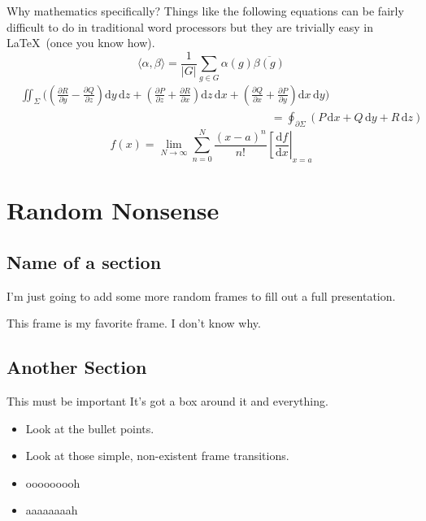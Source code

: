 \documentclass{beamer}
\begin{document}
\begin{frame}
Why mathematics specifically?  Things like the following equations can be fairly difficult to do in traditional word processors but they are trivially easy in \LaTeX\ (once you know how).
\bigskip
\[ \langle \alpha , \beta \rangle = \frac{1}{\vert G \vert} \sum_{g \in G} \alpha(g) \overline{\beta(g)} \]
\bigskip
{\scriptsize
\begin{equation*}
\begin{split}
&\iint_\Sigma \Bigg( \left( \frac{\partial R}{\partial y} - \frac{\partial Q}{\partial z} \right) \mathrm{d}y\,\mathrm{d}z + \left( \frac{\partial P}{\partial z} + \frac{\partial R}{\partial x} \right) \mathrm{d}z\,\mathrm{d}x + \left( \frac{\partial Q}{\partial x} + \frac{\partial P}{\partial y} \right) \mathrm{d}x\,\mathrm{d}y   \Bigg) \\
&\hspace{22em} = \oint_{\partial\Sigma} (P\,\mathrm{d}x + Q\,\mathrm{d}y + R\,\mathrm{d}z)
\end{split}
\end{equation*}
}
\bigskip
\[ f(x) = \lim_{N\to\infty}\sum_{n=0}^N \frac{(x-a)^n}{n!} \left[\frac{\mathrm{d}f}{\mathrm{d}x}\right\vert_{x=a} \]
\end{frame}

\section{Random Nonsense}
\subsection{Name of a section}

\begin{frame}
I'm just going to add some more random frames to fill out a full presentation.
\end{frame}

\begin{frame}
This frame is my favorite frame.  I don't know why.
\end{frame}

\subsection{Another Section}

\begin{frame}
\begin{block}{This must be important}
It's got a box around it and everything.
\end{block}
\pause
\begin{itemize}
\item Look at the bullet points.\pause
\item Look at those simple, non-existent frame transitions.\pause
\item ooooooooh\pause
\item aaaaaaaah
\end{itemize}
\end{frame}
\end{document}
